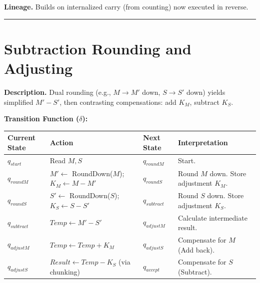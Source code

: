 \documentclass[12pt]{book}
\begin{document}
\textbf{Lineage.} Builds on internalized carry (from counting) now
executed in reverse.

\begin{center}\rule{0.5\linewidth}{0.5pt}\end{center}

\section{Subtraction Rounding and
Adjusting}\label{subtraction-rounding-and-adjusting}

\textbf{Description.} Dual rounding (e.g., \(M \to M'\) down,
\(S \to S'\) down) yields simplified \(M' - S'\), then contrasting
compensations: add \(K_M\), subtract \(K_S\).

\textbf{Transition Function (\(\delta\)):}

\begin{longtable}[]{@{}
  >{\raggedright\arraybackslash}p{}
  >{\raggedright\arraybackslash}p{}
  >{\raggedright\arraybackslash}p{}
  >{\raggedright\arraybackslash}p{}@{}}
\toprule\noalign{}
\begin{minipage}[b]{\linewidth}\raggedright
Current State
\end{minipage} & \begin{minipage}[b]{\linewidth}\raggedright
Action
\end{minipage} & \begin{minipage}[b]{\linewidth}\raggedright
Next State
\end{minipage} & \begin{minipage}[b]{\linewidth}\raggedright
Interpretation
\end{minipage} \\
\midrule\noalign{}
\endhead
\bottomrule\noalign{}
\endlastfoot
\(q_{start}\) & Read \(M, S\) & \(q_{roundM}\) & Start. \\
\(q_{roundM}\) & \(M' \leftarrow\) RoundDown(\(M\));
\(K_M \leftarrow M - M'\) & \(q_{roundS}\) & Round \(M\) down. Store
adjustment \(K_M\). \\
\(q_{roundS}\) & \(S' \leftarrow\) RoundDown(\(S\));
\(K_S \leftarrow S - S'\) & \(q_{subtract}\) & Round \(S\) down. Store
adjustment \(K_S\). \\
\(q_{subtract}\) & \(Temp \leftarrow M' - S'\) & \(q_{adjustM}\) &
Calculate intermediate result. \\
\(q_{adjustM}\) & \(Temp \leftarrow Temp + K_M\) & \(q_{adjustS}\) &
Compensate for \(M\) (Add back). \\
\(q_{adjustS}\) & \(Result \leftarrow Temp - K_S\) (via chunking) &
\(q_{accept}\) & Compensate for \(S\) (Subtract). \\
\end{longtable}
\end{document}

